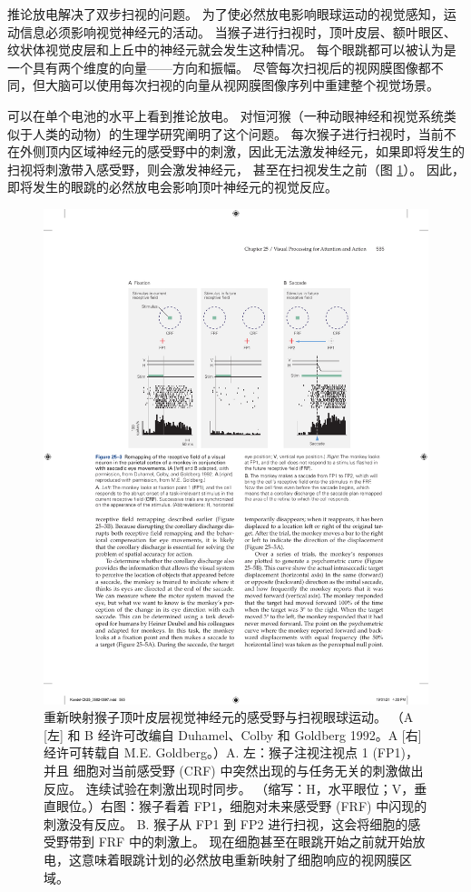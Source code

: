 推论放电解决了双步扫视的问题。 为了使必然放电影响眼球运动的视觉感知，运动信息必须影响视觉神经元的活动。 当猴子进行扫视时，顶叶皮层、额叶眼区、纹状体视觉皮层和上丘中的神经元就会发生这种情况。 每个眼跳都可以被认为是一个具有两个维度的向量——方向和振幅。 尽管每次扫视后的视网膜图像都不同，但大脑可以使用每次扫视的向量从视网膜图像序列中重建整个视觉场景。

可以在单个电池的水平上看到推论放电。 对恒河猴（一种动眼神经和视觉系统类似于人类的动物）的生理学研究阐明了这个问题。 每次猴子进行扫视时，当前不在外侧顶内区域神经元的感受野中的刺激，因此无法激发神经元，如果即将发生的扫视将刺激带入感受野，则会激发神经元， 甚至在扫视发生之前（图 \ref{fig:25_3}）。 
因此，即将发生的眼跳的必然放电会影响顶叶神经元的视觉反应。

\begin{figure}[htbp]
	\centering
	\includegraphics[width=0.75\linewidth]{chap25/fig_25_3}
	\caption{重新映射猴子顶叶皮层视觉神经元的感受野与扫视眼球运动。 （A [左] 和 B 经许可改编自 Duhamel、Colby 和 Goldberg 1992。A [右] 经许可转载自 M.E. Goldberg。）A. 左：猴子注视注视点 1 (FP1)，并且 细胞对当前感受野 (CRF) 中突然出现的与任务无关的刺激做出反应。 连续试验在刺激出现时同步。 （缩写：H，水平眼位；V，垂直眼位。）右图：猴子看着 FP1，细胞对未来感受野 (FRF) 中闪现的刺激没有反应。 B. 猴子从 FP1 到 FP2 进行扫视，这会将细胞的感受野带到 FRF 中的刺激上。 现在细胞甚至在眼跳开始之前就开始放电，这意味着眼跳计划的必然放电重新映射了细胞响应的视网膜区域。}
	\label{fig:25_3}
\end{figure}

